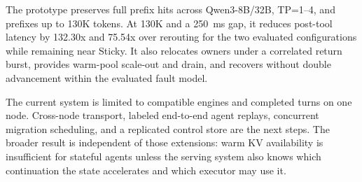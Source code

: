 The prototype preserves full prefix hits across Qwen3-8B/32B, TP=1--4, and prefixes up to 130K tokens. At 130K and a 250~ms gap, it reduces post-tool latency by 132.30x and 75.54x over rerouting for the two evaluated configurations while remaining near Sticky. It also relocates owners under a correlated return burst, provides warm-pool scale-out and drain, and recovers without double advancement within the evaluated fault model.

The current system is limited to compatible engines and completed turns on one node. Cross-node transport, labeled end-to-end agent replays, concurrent migration scheduling, and a replicated control store are the next steps. The broader result is independent of those extensions: warm KV availability is insufficient for stateful agents unless the serving system also knows which continuation the state accelerates and which executor may use it.
